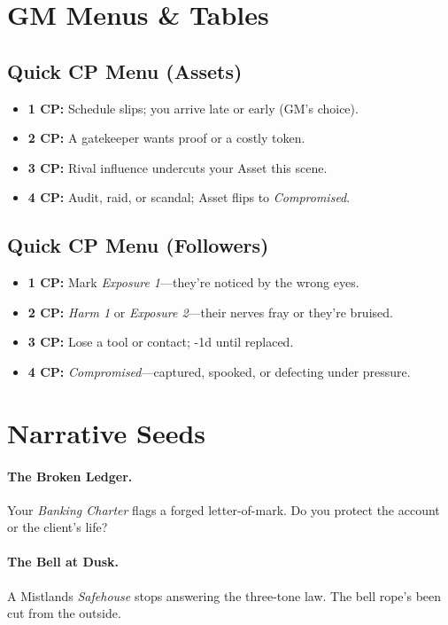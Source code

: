 \begin{multicols}{2}
\section{GM Menus \& Tables}
\subsection*{Quick CP Menu (Assets)}
\begin{itemize}
  \item \textbf{1 CP:} Schedule slips; you arrive late or early (GM’s choice).
  \item \textbf{2 CP:} A gatekeeper wants proof or a costly token.
  \item \textbf{3 CP:} Rival influence undercuts your Asset this scene.
  \item \textbf{4 CP:} Audit, raid, or scandal; Asset flips to \emph{Compromised}.
\end{itemize}

\subsection*{Quick CP Menu (Followers)}
\begin{itemize}
  \item \textbf{1 CP:} Mark \emph{Exposure 1}—they’re noticed by the wrong eyes.
  \item \textbf{2 CP:} \emph{Harm 1} or \emph{Exposure 2}—their nerves fray or they’re bruised.
  \item \textbf{3 CP:} Lose a tool or contact; -1d until replaced.
  \item \textbf{4 CP:} \emph{Compromised}—captured, spooked, or defecting under pressure.
\end{itemize}

\section{Narrative Seeds}
\paragraph{The Broken Ledger.}
Your \emph{Banking Charter} flags a forged letter-of-mark. Do you protect the account or the client’s life?

\paragraph{The Bell at Dusk.}
A Mistlands \emph{Safehouse} stops answering the three-tone law. The bell rope’s been cut from the outside.


\end{multicols}

